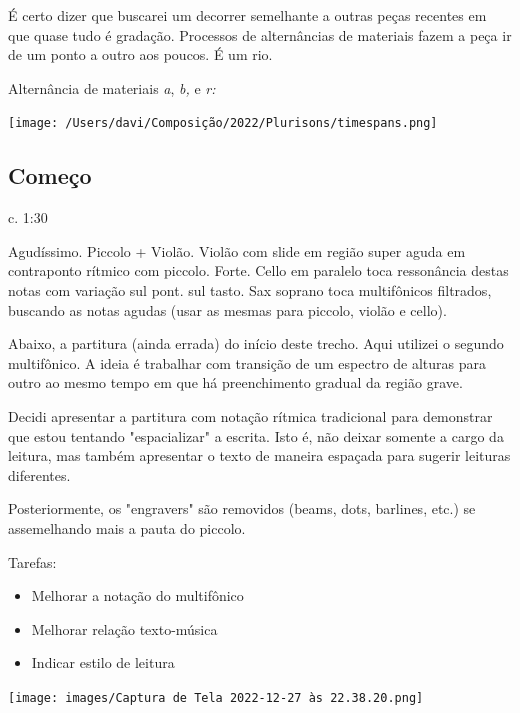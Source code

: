 \documentclass[a4paper]{article}
\begin{document}
É certo dizer que buscarei um decorrer semelhante a outras peças recentes em que quase tudo é gradação. Processos de alternâncias de materiais fazem a peça ir de um ponto a outro aos poucos. É um rio.

Alternância de materiais \emph{a}, \emph{b,} e \emph{r:}
\begin{center}
\texttt{[image: /Users/davi/Composição/2022/Plurisons/timespans.png]}
\end{center}


\subsection*{Começo}
\label{sec:orgd8829f3}
c. 1:30

Agudíssimo. Piccolo + Violão. Violão com slide em região super aguda em contraponto rítmico com piccolo. Forte. Cello em paralelo toca ressonância destas notas com variação sul pont. sul tasto. Sax soprano toca multifônicos filtrados, buscando as notas agudas (usar as mesmas para piccolo, violão e cello).

Abaixo, a partitura (ainda errada) do início deste trecho. Aqui utilizei o segundo multifônico. A ideia é trabalhar com transição de um espectro de alturas para outro ao mesmo tempo em que há preenchimento gradual da região grave.

Decidi apresentar a partitura com notação rítmica tradicional para demonstrar que estou tentando "espacializar" a escrita. Isto é, não deixar somente a cargo da leitura, mas também apresentar o texto de maneira espaçada para sugerir leituras diferentes.

Posteriormente, os "engravers" são removidos (beams, dots, barlines, etc.) se assemelhando mais a pauta do piccolo.

Tarefas:
\begin{itemize}
\item Melhorar a notação do multifônico
\item Melhorar relação texto-música
\item Indicar estilo de leitura
\end{itemize}

\begin{center}
\texttt{[image: images/Captura de Tela 2022-12-27 às 22.38.20.png]}
\end{center}
\end{document}
